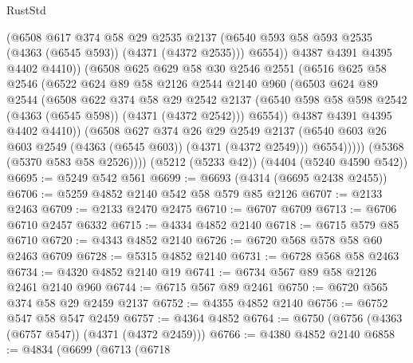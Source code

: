 \begin{lexlean}{RustStd}
\begin{coremodule}
{\begin{coremodule}
{{{{{{{{{{{{{{{{                    (@6508
                      @617
                      @374
                      @58
                      @29
                      @2535
                      @2137
                      (@6540 @593 @58 @593 @2535 (@4363 (@6545 @593)) (@4371 (@4372 @2535)))
                      @6554))
                  @4387
                  @4391
                  @4395
                  @4402
                  @4410))
              (@6508
                @625
                @629
                @58
                @30
                @2546
                @2551
                (@6516
                  @625
                  @58
                  @2546
                  (@6522
                    @624
                    @89
                    @58
                    @2126
                    @2544
                    @2140
                    @960
                    (@6503
                      @624
                      @89
                      @2544
                      (@6508
                        @622
                        @374
                        @58
                        @29
                        @2542
                        @2137
                        (@6540 @598 @58 @598 @2542 (@4363 (@6545 @598)) (@4371 (@4372 @2542)))
                        @6554))
                    @4387
                    @4391
                    @4395
                    @4402
                    @4410))
                (@6508
                  @627
                  @374
                  @26
                  @29
                  @2549
                  @2137
                  (@6540 @603 @26 @603 @2549 (@4363 (@6545 @603)) (@4371 (@4372 @2549)))
                  @6554)))))
        (@5368 (@5370 @583 @58 @2526))))
    (@5212 (@5233 @42))
    (@4404 (@5240 @4590 @542))
@6695 := @5249 @542 @561
@6699 := @6693 (@4314 (@6695 @2438 @2455))
@6706 := @5259 @4852 @2140 @542 @58 @579 @85 @2126
@6707 := @2133 @2463
@6709 := @2133 @2470 @2475
@6710 := @6707 @6709
@6713 := @6706 @6710 @2457 @6332
@6715 := @4334 @4852 @2140
@6718 := @6715 @579 @85 @6710
@6720 := @4343 @4852 @2140
@6726 := @6720 @568 @578 @58 @60 @2463 @6709
@6728 := @5315 @4852 @2140
@6731 := @6728 @568 @58 @2463
@6734 := @4320 @4852 @2140 @19
@6741 := @6734 @567 @89 @58 @2126 @2461 @2140 @960
@6744 := @6715 @567 @89 @2461
@6750 := @6720 @565 @374 @58 @29 @2459 @2137
@6752 := @4355 @4852 @2140
@6756 := @6752 @547 @58 @547 @2459
@6757 := @4364 @4852
@6764 := @6750 (@6756 (@4363 (@6757 @547)) (@4371 (@4372 @2459)))
@6766 := @4380 @4852 @2140
@6858 := @4834
    (@6699
      (@6713
        (@6718
}}}}}}}}}}}}}}}}
\end{coremodule}}
\end{coremodule}
\end{lexlean}
